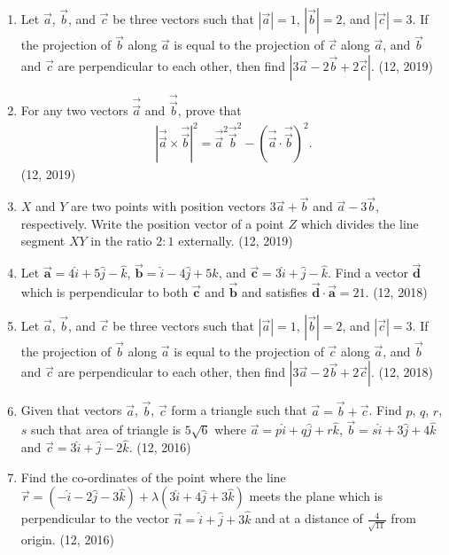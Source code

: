 \begin{enumerate}[label=\thesubsection.\arabic*,ref=\thesubsection.\theenumi]
	\item Let $\overrightarrow{a}$, $\overrightarrow{b}$, and $\overrightarrow{c}$ be three vectors such that $|\overrightarrow{a}| = 1$, $|\overrightarrow{b}| = 2$, and $|\overrightarrow{c}| = 3$. If the projection of $\overrightarrow{b}$ along $\overrightarrow{a}$ is equal to the projection of $\overrightarrow{c}$ along $\overrightarrow{a}$, and $\overrightarrow{b}$ and $\overrightarrow{c}$ are perpendicular to each other, then find $|3\overrightarrow{a} - 2\overrightarrow{b} + 2\overrightarrow{c}|$. \hfill (12, 2019)
	\item For any two vectors $\overrightarrow{\vec{a}}$ and $\overrightarrow{\vec{b}}$, prove that
	\begin{align*}
	|\overrightarrow{\vec{a}} \times \overrightarrow{\vec{b}}|^2 = \overrightarrow{\vec{a}}^2 \overrightarrow{\vec{b}}^2 - (\overrightarrow{\vec{a}} \cdot \overrightarrow{\vec{b}})^2.
	\end{align*} \hfill (12, 2019)
	\item $X$ and $Y$ are two points with position vectors $3\overrightarrow{a} + \overrightarrow{b}$ and $\overrightarrow{a} - 3\overrightarrow{b}$, respectively. Write the position vector of a point $Z$ which divides the line segment $XY$ in the ratio $2:1$ externally. \hfill (12, 2019)
\item Let $\overrightarrow{\mathbf{a}} = 4\hat{i} + 5\hat{j} - \hat{k}$, $\overrightarrow{\mathbf{b}} = \hat{i} - 4\hat{j} + 5\hat{k}$, and $\overrightarrow{\mathbf{c}} = 3\hat{i} + \hat{j} - \hat{k}$. Find a vector $\overrightarrow{\mathbf{d}}$ which is perpendicular to both $\overrightarrow{\mathbf{c}}$ and $\overrightarrow{\mathbf{b}}$ and satisfies $\overrightarrow{\mathbf{d}} \cdot \overrightarrow{\mathbf{a}} = 21$. \hfill (12, 2018)
\item Let $\overrightarrow{a}$, $\overrightarrow{b}$, and $\overrightarrow{c}$ be three vectors such that $|\overrightarrow{a}| = 1$, $|\overrightarrow{b}| = 2$, and $|\overrightarrow{c}| = 3$. If the projection of $\overrightarrow{b}$ along $\overrightarrow{a}$ is equal to the projection of $\overrightarrow{c}$ along $\overrightarrow{a}$, and $\overrightarrow{b}$ and $\overrightarrow{c}$ are perpendicular to each other, then find $|3\overrightarrow{a} - 2\overrightarrow{b} + 2\overrightarrow{c}|$. \hfill (12, 2018)
\item Given that vectors $\overrightarrow{a}$, $\overrightarrow{b}$, $\overrightarrow{c}$ form a triangle such that
      $\overrightarrow{a} = \overrightarrow{b}+\overrightarrow{c}$. Find $p$, $q$, $r$, $s$ such that area of triangle is $5\sqrt{6}$ where $\overrightarrow{a} = p\hat{i} +q\hat{j}+r\hat{k}$,
      $\overrightarrow{b} = s\hat{i} +3\hat{j}+4\hat{k}$ and $\overrightarrow{c}=3\hat{i} +\hat{j}-2\hat{k}$. \hfill (12, 2016)
\item Find the co-ordinates of the point where the line $\overrightarrow{r}=(-\hat{i}-2\hat{j}-3\hat{k})+\lambda(3\hat{i} +4\hat{j}+3\hat{k})$ meets the plane which is perpendicular to the vector $\overrightarrow{n}=\hat{i}+\hat{j} +3\hat{k}$ and at a distance of
      $\frac{4}{\sqrt{11}}$ from origin. \hfill (12, 2016)

\end{enumerate}
